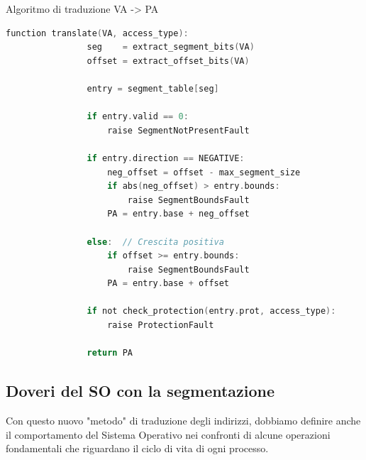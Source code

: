\documentclass[12pt]{report}
\begin{document}
	\begin{esempio}{Algoritmo di traduzione VA -> PA}{}
		\begin{lstlisting}[language=C]
			function translate(VA, access_type):
				seg    = extract_segment_bits(VA)
				offset = extract_offset_bits(VA)
				
				entry = segment_table[seg]
				
				if entry.valid == 0:
					raise SegmentNotPresentFault
				
				if entry.direction == NEGATIVE:
					neg_offset = offset - max_segment_size
					if abs(neg_offset) > entry.bounds:
						raise SegmentBoundsFault
					PA = entry.base + neg_offset
				
				else:  // Crescita positiva
					if offset >= entry.bounds:
						raise SegmentBoundsFault
					PA = entry.base + offset
				
				if not check_protection(entry.prot, access_type):
					raise ProtectionFault
				
				return PA
		\end{lstlisting}
	\end{esempio}
	
	\subsection{Doveri del SO con la segmentazione}
	Con questo nuovo "metodo" di traduzione degli indirizzi, dobbiamo definire anche il comportamento del Sistema Operativo nei confronti di alcune operazioni fondamentali che riguardano il ciclo di vita di ogni processo.
	
\end{document}
